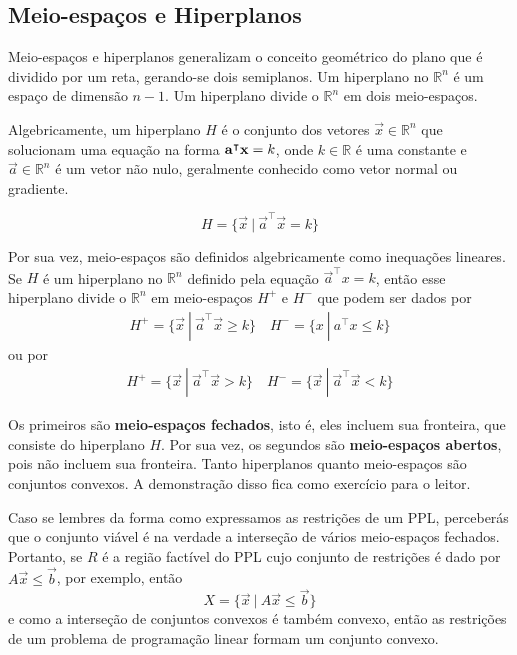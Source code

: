 \subsection{Meio-espaços e Hiperplanos}
Meio-espaços e hiperplanos generalizam o conceito geométrico do plano que é dividido
por um reta, gerando-se dois semiplanos. Um hiperplano no $\mathbb{R}^n$ é um
espaço de dimensão $n-1$. Um hiperplano divide o $\mathbb{R}^n$ em dois meio-espaços.

Algebricamente, um hiperplano $H$ é o conjunto dos vetores $\vec x \in \mathbb{R}^n$
que solucionam uma equação na forma $\mathbf{\mathbf a}^\intercal \mathbf x = k$, onde
$k \in \mathbb{R}$ é uma constante e $\vec a \in \mathbb{R}^n$ é um vetor não nulo,
geralmente conhecido como vetor normal ou gradiente.

\begin{equation*}
	H = \{\vec x\ |\ \vec a^\intercal \vec x = k\}
\end{equation*}

Por sua vez, meio-espaços são definidos algebricamente como inequações lineares.
Se $H$ é um hiperplano no $\mathbb{R}^n$ definido pela equação $\vec a^\intercal x = k$,
então esse hiperplano divide o $\mathbb{R}^n$ em meio-espaços $H^+$ e $H^-$ que
podem ser dados por
\begin{align*}
	H^+ = \{\vec x \ |\ \vec a^\intercal \vec x  \geq k\} \quad
	H^- = \{x \ |\ a^\intercal x  \leq k\}
\end{align*}
ou por
\begin{align*}
	H^+ = \{\vec x \ |\ \vec a^\intercal \vec x  > k\} \quad
	H^- = \{\vec x \ |\ \vec a^\intercal \vec x  < k\}
\end{align*}

Os primeiros são \textbf{meio-espaços fechados}, isto é, eles incluem sua fronteira,
que consiste do hiperplano $H$. Por sua vez, os segundos são \textbf{meio-espaços abertos},
pois não incluem sua fronteira. Tanto hiperplanos quanto meio-espaços são conjuntos convexos.
A demonstração disso fica como exercício para o leitor.

Caso se lembres da forma como expressamos as restrições de um PPL, perceberás
que o conjunto viável é na verdade a interseção de vários meio-espaços fechados.
Portanto, se $R$ é a região factível do PPL cujo conjunto de restrições é dado
por $A\vec x \leq \vec b$, por exemplo, então
\[X = \{\vec x \ | \ A\vec x \leq \vec b\}\]
e como a interseção de conjuntos convexos é também convexo, então as restrições
de um problema de programação linear formam um conjunto convexo.

